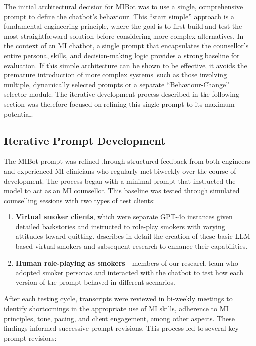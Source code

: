 The initial architectural decision for MIBot was to use a single, comprehensive prompt to define the chatbot's behaviour. This ``start simple'' approach is a fundamental engineering principle, where the goal is to first build and test the most straightforward solution before considering more complex alternatives. In the context of an MI chatbot, a single prompt that encapsulates the counsellor's entire persona, skills, and decision-making logic provides a strong baseline for evaluation. If this simple architecture can be shown to be effective, it avoids the premature introduction of more complex systems, such as those involving multiple, dynamically selected prompts or a separate ``Behaviour-Change'' selector module. The iterative development process described in the following section was therefore focused on refining this single prompt to its maximum potential.

\subsection{Iterative Prompt Development}
The MIBot prompt was refined through structured feedback from both engineers and experienced MI clinicians who regularly met biweekly over the course of development. The process began with a minimal prompt that instructed the model to act as an MI counsellor. This baseline was tested through simulated counselling sessions with two types of test clients:

\begin{enumerate}
    \item \textbf{Virtual smoker clients}, which were separate GPT-4o instances given detailed backstories and instructed to role-play smokers with varying attitudes toward quitting.  describes in detail the creation of these basic LLM-based virtual smokers and subsequent research to enhance their capabilities.
    \item \textbf{Human role-playing as smokers}---members of our research team who adopted smoker personas and interacted with the chatbot to test how each version of the prompt behaved in different scenarios.
\end{enumerate}

After each testing cycle, transcripts were reviewed in bi-weekly meetings to identify shortcomings in the appropriate use of MI skills, adherence to MI principles, tone, pacing, and client engagement, among other aspects. These findings informed successive prompt revisions. 
This process led to several key prompt revisions:


